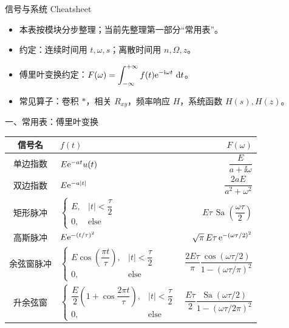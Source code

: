 \documentclass[a4paper]{ctexart}
\newcommand{\Sa}{\operatorname{Sa}}
\begin{document}
  \begin{cheatsheetcolumns}[2]
  \begin{card}{信号与系统 Cheatsheet}
    \begin{itemize}
      \item 本表按模块分步整理；当前先整理第一部分“常用表”。
      \item 约定：连续时间用 $t,\omega,s$；离散时间用 $n,\Omega,z$。
      \item 傅里叶变换约定：$F(\omega)=\displaystyle\int_{-\infty}^{+\infty}f(t)\e^{-\ii\omega t}\,\odif{t}$。
      \item 常见算子：卷积 $*$，相关 $R_{xy}$，频率响应 $H$，系统函数 $H(s),H(z)$。
    \end{itemize}
  \end{card}

  \begin{card}{一、常用表：傅里叶变换}
    {\scriptsize\setlength{\tabcolsep}{0.5pt}\renewcommand{\arraystretch}{0.95}\setlength{\jot}{0pt}
    \begin{tabularx}{\linewidth}{@{}S|M|R@{}}
      信号名 & $f(t)$ & $F(\omega)$ \\ \hline
      单边指数 & $E\mathrm{e}^{-at}u(t)$
        & $\dfrac{E}{a+\ii\omega}$ \\ \hline
      双边指数 & $E\mathrm{e}^{-a|t|}$
        & $\dfrac{2aE}{a^2+\omega^2}$ \\ \hline
      矩形脉冲 & $\begin{cases}E,& |t|<\dfrac{\tau}{2}\\0,&\text{else}\end{cases}$
        & $E\tau\,\Sa\!\left(\dfrac{\omega\tau}{2}\right)$ \\ \hline
      高斯脉冲 & $E\mathrm{e}^{-(t/\tau)^2}$
        & $\sqrt{\pi}\,E\tau\,\mathrm{e}^{-(\omega\tau/2)^2}$ \\ \hline
      余弦窗脉冲 & $\begin{cases}E\cos\!\left(\dfrac{\pi t}{\tau}\right),& |t|<\dfrac{\tau}{2}\\0,&\text{else}\end{cases}$
        & $\dfrac{2E\tau}{\pi}\dfrac{\cos(\omega\tau/2)}{1-(\omega\tau/\pi)^2}$ \\ \hline
      升余弦窗 & $\begin{cases}\dfrac{E}{2}\left(1+\cos\dfrac{2\pi t}{\tau}\right),& |t|<\dfrac{\tau}{2}\\0,&\text{else}\end{cases}$
        & $\dfrac{E\tau}{2}\dfrac{\Sa(\omega\tau/2)}{1-(\omega\tau/2\pi)^2}$ \\ \hline

\end{tabularx}}
\end{card}
\end{cheatsheetcolumns}
\end{document}

